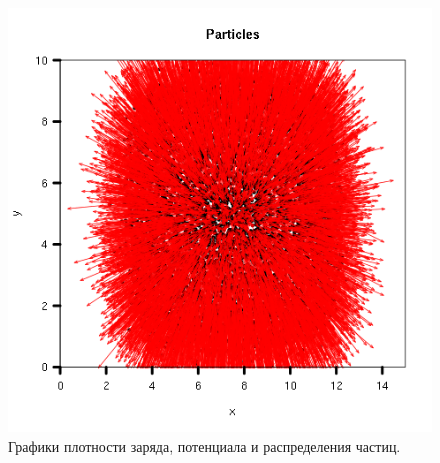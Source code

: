 \begin{figure}[h]
  \includegraphics[scale=0.3]{./figs/out0001_particles.png}
  \caption{
    Графики плотности заряда, потенциала и распределения частиц.
  }
\end{figure}

